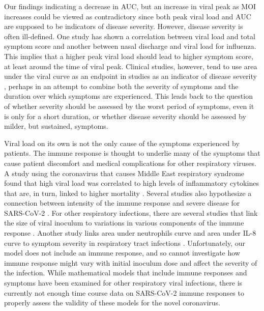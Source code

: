 Our findings indicating a decrease in AUC, but an increase in viral peak as MOI increases could be viewed as contradictory since both peak viral load and AUC are supposed to be indicators of disease severity. However, disease severity is often ill-defined. One study has shown a correlation between viral load and total symptom score \cite{chen12} and another between nasal discharge and viral load \cite{handel15} for influenza. This implies that a higher peak viral load should lead to higher symptom score, at least around the time of viral peak. Clinical studies, however, tend to use area under the viral curve as an endpoint in studies as an indicator of disease severity \cite{devincenzo20, hershberger19, stevens18, devincenzo15}, perhaps in an attempt to combine both the severity of symptoms and the duration over which symptoms are experienced. This leads back to the question of whether severity should be assessed by the worst period of symptoms, even it is only for a short duration, or whether disease severity should be assessed by milder, but sustained, symptoms.

Viral load on its own is not the only cause of the symptoms experienced by patients. The immune response is thought to underlie many of the symptoms that cause patient discomfort \cite{hijano19} and medical complications \cite{xu19} for other respiratory viruses. A study using the coronavirus that causes Middle East respiratory syndrome found that high viral load was correlated to high levels of inflammatory cytokines that are, in turn, linked to higher mortality \cite{alosaimi20}. Several studies also hypothesize a connection between intensity of the immune response and severe disease for SARS-CoV-2 \cite{lin20,cao20path,zhu20cardio}. For other respiratory infections, there are several studies that link the size of viral inoculum to variations in various components of the immune response \cite{go19, littwitz17, handel18, redeker14, anderson10}. Another study links area under neutrophils curve and area under IL-8 curve to symptom severity in respiratory tract infections \cite{henriquez15}. Unfortunately, our model does not include an immune response, and so cannot investigate how immune response might vary with initial inoculum dose and affect the severity of the infection. While mathematical models that include immune responses \cite{dobrovolny13} and symptoms \cite{canini11,price15} have been examined for other respiratory viral infections, there is currently not enough time course data on SARS-CoV-2 immune responses to properly assess the validity of these models for the novel coronavirus.  

